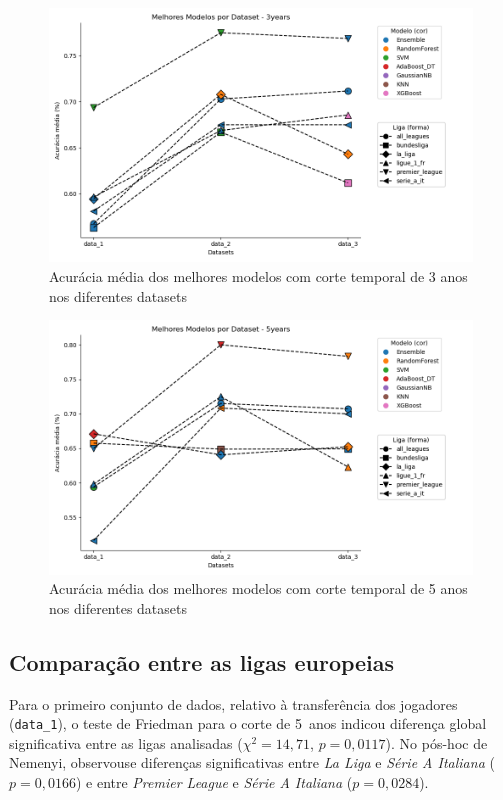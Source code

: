 \documentclass[a4paper]{article}
\theoremstyle{plain}
\theoremstyle{definition}
\begin{document}
\begin{figure}[H]
    \centering
    \includegraphics[width=1\textwidth]{Figures/Dataset_3years.png}
    \caption{Acurácia média dos melhores modelos com corte temporal de 3 anos nos diferentes datasets}
    \label{fig:Figura8}
\end{figure}

\begin{figure}[H]
    \centering
    \includegraphics[width=1\textwidth]{Figures/Dataset_5years.png}
    \caption{Acurácia média dos melhores modelos com corte temporal de 5 anos nos diferentes datasets}
    \label{fig:Figura9}
\end{figure}

\subsection{Comparação entre as ligas europeias}

Para o primeiro conjunto de dados, relativo à transferência dos jogadores (\texttt{data\_1}), o teste de Friedman para o corte de 5~anos indicou diferença global significativa entre as ligas analisadas ($\chi^{2}=14{,}71$, $p=0{,}0117$). No pós-hoc de Nemenyi, observou\-se diferenças significativas entre \textit{La Liga} e \textit{Série A Italiana} ($p=0{,}0166$) e entre \textit{Premier League} e \textit{Série A Italiana} ($p=0{,}0284$).
\end{document}
